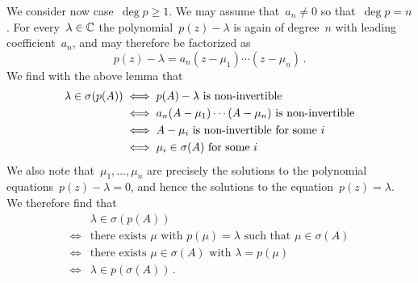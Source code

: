 We consider now case~$\deg p \geq 1$.
We may assume that~$a_n \neq 0$ so that~$\deg p = n$.
For every~$\lambda \in \mathbb{C}$ the polynomial~$p(z) - \lambda$ is again of degree~$n$ with leading coefficient~$a_n$, and may therefore be factorized as
\[
  p(z) - \lambda
  =
  a_n (z - \mu_1) \dotsm (z - \mu_n) \,.
\]
We find with the above lemma that
\begin{align*}
  \lambda \in \sigma(p(A))
  &\iff
  \text{$p(A) - \lambda$ is \dash{non}{invertible}}
  \\
  &\iff
  \text{$a_n (A - \mu_1) \dotsm (A - \mu_n)$ is \dash{non}{invertible}}
  \\
  &\iff
  \text{$A - \mu_i$ is \dash{non}{invertible} for some~$i$}
  \\
  &\iff
  \text{$\mu_i \in \sigma(A)$ for some~$i$}
\end{align*}
We also note that~$\mu_1, \dotsc, \mu_n$ are precisely the solutions to the polynomial equations~$p(z) - \lambda = 0$, and hence the solutions to the equation~$p(z) = \lambda$.
We therefore find that
\begin{align*}
  {}&
  \lambda \in \sigma(p(A))
  \\
  \iff{}&
  \text{there exists~$\mu$ with~$p(\mu) = \lambda$ such that~$\mu \in \sigma(A)$}
  \\
  \iff{}&
  \text{there exists~$\mu \in \sigma(A)$ with~$\lambda = p(\mu)$}
  \\
  \iff{}&
  \lambda \in p(\sigma(A))  \,.
\end{align*}




